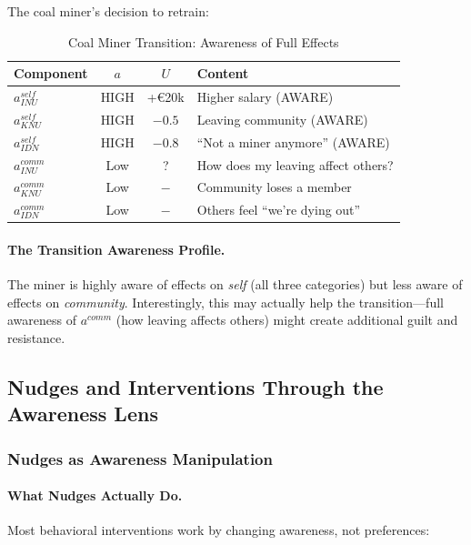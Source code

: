 The coal miner's decision to retrain:

\begin{table}[htbp]
\centering
\caption{Coal Miner Transition: Awareness of Full Effects}
\label{tab:miner-awareness}
\renewcommand{\arraystretch}{1.3}
\begin{tabular}{@{}lccl@{}}
\toprule
\textbf{Component} & \textbf{$a$} & \textbf{$U$} & \textbf{Content} \\
\midrule
$a^{self}_{INU}$ & HIGH & +\euro{20k} & Higher salary (AWARE) \\
$a^{self}_{KNU}$ & HIGH & $-0.5$ & Leaving community (AWARE) \\
$a^{self}_{IDN}$ & HIGH & $-0.8$ & ``Not a miner anymore'' (AWARE) \\
$a^{comm}_{INU}$ & Low & ? & How does my leaving affect others? \\
$a^{comm}_{KNU}$ & Low & $-$ & Community loses a member \\
$a^{comm}_{IDN}$ & Low & $-$ & Others feel ``we're dying out'' \\
\bottomrule
\end{tabular}
\end{table}

\paragraph{The Transition Awareness Profile.}
The miner is highly aware of effects on \emph{self} (all three categories) 
but less aware of effects on \emph{community}. Interestingly, this may 
actually help the transition---full awareness of $a^{comm}$ (how leaving 
affects others) might create additional guilt and resistance.

\subsection{Nudges and Interventions Through the Awareness Lens}
\label{subsec:awareness-interventions}

\subsubsection{Nudges as Awareness Manipulation}

\paragraph{What Nudges Actually Do.}
Most behavioral interventions work by changing awareness, not preferences:

